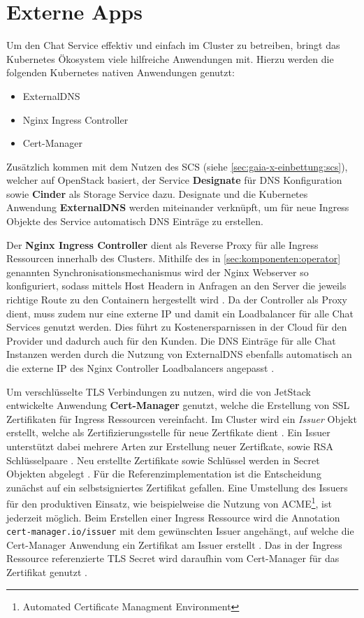 \section{Externe Apps}
\label{sec:komponenten:externe-apps}

Um den Chat Service effektiv und einfach im Cluster zu betreiben, bringt das Kubernetes Ökosystem viele hilfreiche Anwendungen mit.
Hierzu werden die folgenden Kubernetes nativen Anwendungen genutzt:
\begin{itemize}
  \item ExternalDNS
  \item Nginx Ingress Controller
  \item Cert-Manager
\end{itemize}

Zusätzlich kommen mit dem Nutzen des \acf{SCS} (siehe \ref{sec:gaia-x-einbettung:scs}),
welcher auf OpenStack basiert, der Service \textbf{Designate}
für DNS Konfiguration sowie \textbf{Cinder} als Storage Service dazu. 
Designate und die Kubernetes Anwendung \textbf{ExternalDNS} werden miteinander
verknüpft, um für neue Ingress Objekte des Service automatisch DNS Einträge zu erstellen. 

Der \textbf{Nginx Ingress Controller} dient als Reverse Proxy für alle Ingress Ressourcen innerhalb des Clusters.
Mithilfe des in \ref{sec:komponenten:operator} genannten Synchronisationsmechanismus wird der Nginx Webserver so 
konfiguriert, sodass mittels Host Headern in Anfragen an den Server die jeweils richtige Route zu den Containern hergestellt wird \cite{nginxIngressController}. 
Da der Controller als Proxy dient, muss zudem nur eine externe IP und damit ein Loadbalancer für alle Chat Services genutzt werden.
Dies führt zu Kostenersparnissen in der Cloud für den Provider und dadurch auch für den Kunden.
Die DNS Einträge für alle Chat Instanzen werden durch die Nutzung 
von ExternalDNS ebenfalls automatisch an die externe IP des Nginx Controller Loadbalancers angepasst \cite{externalDNS}.

Um verschlüsselte TLS Verbindungen zu nutzen, wird die von JetStack entwickelte Anwendung \textbf{Cert-Manager} genutzt,
welche die Erstellung von SSL Zertifikaten für Ingress Ressourcen vereinfacht. Im Cluster wird ein \emph{Issuer} Objekt
erstellt, welche als Zertifizierungsstelle für neue Zertfikate dient \cite{CertManager2021}. 
Ein Issuer unterstützt dabei mehrere Arten zur Erstellung neuer Zertifkate, sowie RSA Schlüsselpaare \cite{CertManager2021}.
Neu erstellte Zertifikate sowie Schlüssel werden in Secret Objekten abgelegt \cite{CertManager2021}.
Für die Referenzimplementation ist die Entscheidung zunächst auf ein selbstsigniertes Zertifikat gefallen.
Eine Umstellung des Issuers für den produktiven Einsatz, 
wie beispielweise die Nutzung von ACME\footnote{Automated Certificate Managment Environment},
ist jederzeit möglich. 
Beim Erstellen einer Ingress Ressource wird die Annotation \texttt{cert-manager.io/issuer} mit dem gewünschten Issuer angehängt,
auf welche die Cert-Manager Anwendung ein Zertifikat am Issuer erstellt \cite{CertManager2021}. 
Das in der Ingress Ressource referenzierte TLS Secret wird daraufhin vom Cert-Manager für das Zertifikat genutzt \cite{CertManager2021}.

